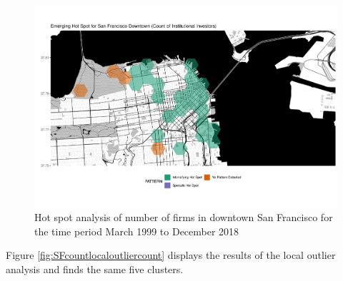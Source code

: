 \begin{figure}
	\centering
	\includegraphics[width=1\linewidth]{Figures/ChapterIV/SF_Count_EH_Downtown}
	\caption[Hot Spot Analysis of Number of Firms in Downtown San Francisco 1999-2018]{Hot spot analysis of number of firms in downtown San Francisco for the time period March 1999 to December 2018}
	\label{fig:SFcounthotspot_Downtown}
\end{figure}

Figure \ref{fig:SFcountlocaloutliercount} displays the results of the local outlier analysis and finds the same five clusters.     

